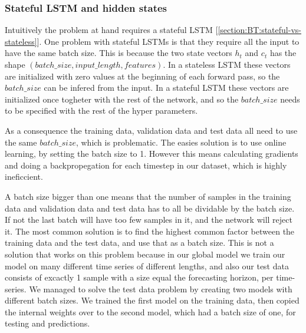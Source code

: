 \subsubsection{Stateful LSTM and hidden states}
\label{section:Method:stateful-lstm-and-hidden-states}

Intuitively the problem at hand requires a stateful LSTM [\cref{section:BT:stateful-vs-stateless}].
One problem with stateful LSTMs is that they require all the input to have the same
batch size.
This is because the two state vectors $h_t$ and $c_t$ has the shape
$(batch\_size, input\_length, features)$. In a stateless LSTM these
vectors are initialized with zero values at the beginning of each forward pass,
so the $batch\_size$ can be infered from the input.
In a stateful LSTM these vectors are initialized once togheter with the rest
of the network, and so the $batch\_size$ needs to be specified with
the rest of the hyper parameters.

As a consequence the training data, validation data and test data all
need to use the same $batch\_size$, which is problematic.
The easies solution is to use online learning, by setting the batch size to 1.
However this means calculating gradients and doing a backpropegation for each
timestep in our dataset, which is highly ineficcient.

A batch size bigger than one means that the number of samples in
the training data and validation data and test data has to all be
dividable by the batch size. If not the last batch will have too few samples in it,
and the network will reject it.
The most common solution is to find the highest common factor
between the training data and the test data, and use that as a batch size.
This is not a solution that works on this problem because in our global model
we train our model on many different time series of different lengths,
and
also our test data consists of excactly 1 sample with a size equal the
forecasting horizon, per time-series.
We managed to solve the test data problem by creating two models with
different batch sizes. We trained the first model on the training data,
then copied the internal weights over to the second model, which had a
batch size of one, for testing and
predictions.


